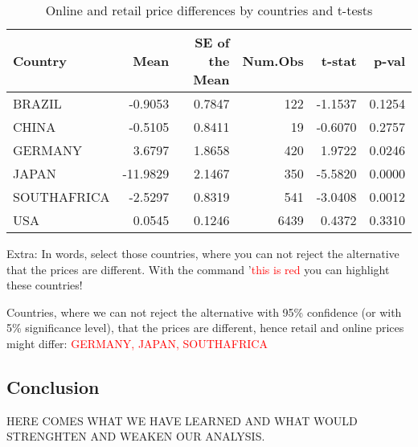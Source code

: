 \documentclass[
]{article}
\begin{document}
\begin{table}[H]

\caption{\label{tab:unnamed-chunk-4}Online and retail price differences by countries and t-tests}
\centering
\begin{tabular}[t]{lrrrrr}
\toprule
Country & Mean & SE of the Mean & Num.Obs & t-stat & p-val\\
\midrule
BRAZIL & -0.9053 & 0.7847 & 122 & -1.1537 & 0.1254\\
CHINA & -0.5105 & 0.8411 & 19 & -0.6070 & 0.2757\\
GERMANY & 3.6797 & 1.8658 & 420 & 1.9722 & 0.0246\\
JAPAN & -11.9829 & 2.1467 & 350 & -5.5820 & 0.0000\\
SOUTHAFRICA & -2.5297 & 0.8319 & 541 & -3.0408 & 0.0012\\
\addlinespace
USA & 0.0545 & 0.1246 & 6439 & 0.4372 & 0.3310\\
\bottomrule
\end{tabular}
\end{table}

Extra: In words, select those countries, where you can not reject the
alternative that the prices are different. With the command
'\textcolor{red}{this is red} you can highlight these countries!

Countries, where we can not reject the alternative with 95\% confidence
(or with 5\% significance level), that the prices are different, hence
retail and online prices might differ:
\textcolor{red}{GERMANY, JAPAN, SOUTHAFRICA}

\hypertarget{conclusion}{%
\subsection{Conclusion}\label{conclusion}}

HERE COMES WHAT WE HAVE LEARNED AND WHAT WOULD STRENGHTEN AND WEAKEN OUR
ANALYSIS.
\end{document}

